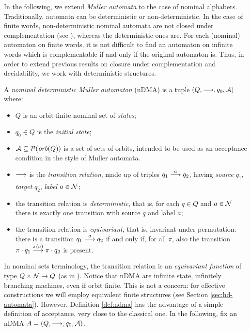 
In the following, we extend \emph{Muller automata} to the case of nominal alphabets. Traditionally, automata can be deterministic or non-deterministic. In the case of finite words, non-deterministic nominal automata are not closed under complementation (see \cite{TODO}), whereas the deterministic ones are. For each (nominal) automaton on finite words, it is not difficult to find an automaton on infinite words which is complementable if and only if the original automaton is. Thus, in order to extend previous results on closure under complementation and decidability, we work with deterministic structures.



\begin{definition}\label{def:ndma}
 A \emph{nominal deterministic Muller automaton} (nDMA) is a tuple $(Q,\overset{}{\longrightarrow},q_0,\mathcal{A})$ where:
 
  \begin{itemize}
  \item $Q$ is an orbit-finite nominal set of \emph{states};
  
  \item $q_0 \in Q$ is the \emph{initial state};
  
  \item $\mathcal{A} \subseteq \mathcal{P}(\mathit{orb}(Q))$ is a set of sets of orbits, intended to be used as an acceptance condition in the style of Muller automata.
  
  \item $\overset{}{\underset{}{\longrightarrow}}$ is the \emph{transition relation}, made up of triples $q_1 \overset{a}{\longrightarrow} q_2$, having \emph{source} $q_1$, \emph{target} $q_2$, \emph{label} $a \in \mathcal{N}$;
  
  \item the transition relation is \emph{deterministic}, that is, for each $q \in Q$ and $a \in \mathcal{N}$ there is exactly one transition with source $q$ and label $a$;
  
  \item the transition relation is \emph{equivariant}, that is, invariant under permutation: there is a transition $q_1 \overset{a}{\longrightarrow} q_2$ if and only if, for all $\pi$, also the transition $\pi \cdot q_1 \overset{\pi(a)}{\longrightarrow} \pi \cdot q_2$ is present.
 \end{itemize}
\end{definition}

In nominal sets terminology, the transition relation is an \emph{equivariant function} of type $Q \times \mathcal{N} \to Q$ (as in \cite{MikBartekLICS}).  Notice that nDMA are infinite state, infinitely branching machines, even if orbit finite. This is not a concern: for effective constructions we will employ equivalent finite structures (see Section \ref{sec:hd-automata}). However, Definition \ref{def:ndma} has the advantage of a simple definition of acceptance, very close to the classical one. In the following, fix an nDMA $A=(Q,\overset{}{\longrightarrow},q_0,\mathcal{A})$.

